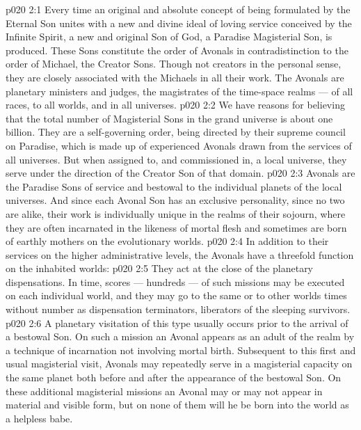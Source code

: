 \vs p020 2:1 Every time an original and absolute concept of being formulated by the Eternal Son unites with a new and divine ideal of loving service conceived by the Infinite Spirit, a new and original Son of God, a Paradise Magisterial Son, is produced. These Sons constitute the order of Avonals in contradistinction to the order of Michael, the Creator Sons. Though not creators in the personal sense, they are closely associated with the Michaels in all their work. The Avonals are planetary ministers and judges, the magistrates of the time\hyp{}space realms --- of all races, to all worlds, and in all universes.
\vs p020 2:2 We have reasons for believing that the total number of Magisterial Sons in the grand universe is about one billion. They are a self\hyp{}governing order, being directed by their supreme council on Paradise, which is made up of experienced Avonals drawn from the services of all universes. But when assigned to, and commissioned in, a local universe, they serve under the direction of the Creator Son of that domain.
\vs p020 2:3 Avonals are the Paradise Sons of service and bestowal to the individual planets of the local universes. And since each Avonal Son has an exclusive personality, since no two are alike, their work is individually unique in the realms of their sojourn, where they are often incarnated in the likeness of mortal flesh and sometimes are born of earthly mothers on the evolutionary worlds.
\vs p020 2:4 \pc In addition to their services on the higher administrative levels, the Avonals have a threefold function on the inhabited worlds:
\vs p020 2:5 \bibnobreakspace {} They act at the close of the planetary dispensations. In time, scores --- hundreds --- of such missions may be executed on each individual world, and they may go to the same or to other worlds times without number as dispensation terminators, liberators of the sleeping survivors.
\vs p020 2:6 \bibnobreakspace {} A planetary visitation of this type usually occurs prior to the arrival of a bestowal Son. On such a mission an Avonal appears as an adult of the realm by a technique of incarnation not involving mortal birth. Subsequent to this first and usual magisterial visit, Avonals may repeatedly serve in a magisterial capacity on the same planet both before and after the appearance of the bestowal Son. On these additional magisterial missions an Avonal may or may not appear in material and visible form, but on none of them will he be born into the world as a helpless babe.
